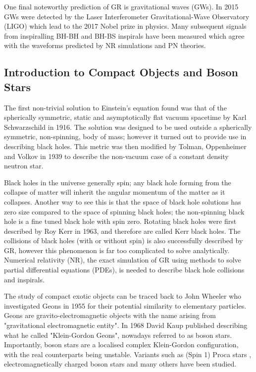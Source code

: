 One final noteworthy prediction of GR is gravitational waves (GWs). In 2015 GWs were detected by the Laser Interferometer Gravitational-Wave Observatory (LIGO) which lead to the 2017 Nobel prize in physics. Many subsequent signals from inspiralling BH-BH and BH-BS inspirals have been measured which agree with the waveforms predicted by NR simulations and PN theories. 

\subsection{Introduction to Compact Objects and Boson Stars}
The first non-trivial solution to Einstein's equation found was that of the spherically symmetric, static and asymptotically flat vacuum spacetime by Karl Schwarzschild in 1916. The solution was designed to be used outside a spherically symmetric, non-spinning, body of mass; however it turned out to provide use in describing black holes. This metric was then modified by Tolman, Oppenheimer and Volkov in 1939 to describe the non-vacuum case of a constant density neutron star. 

Black holes in the universe generally spin; any black hole forming from the collapse of matter will inherit the angular momentum of the matter as it collapses. Another way to see this is that the space of black hole solutions has zero size compared to the space of spinning black holes; the non-spinning black hole is a fine tuned black hole with spin zero. Rotating black holes were first described by Roy Kerr in 1963, and therefore are called Kerr black holes. The collisions of black holes (with or without spin) is also successfully described by GR, however this phenomenon is far too complicated to solve analytically. Numerical relativity (NR), the exact simulation of GR using methods to solve partial differential equations (PDEs), is needed to describe black hole collisions and inspirals. 

The study of compact exotic objects can be traced back to John Wheeler who investigated Geons in 1955 for their potential similarity to elementary particles. Geons are gravito-electromagnetic objects with the name arising from "gravitational electromagnetic entity". In 1968 David Kaup published \cite{Kaup:1968zz} describing what he called "Klein-Gordon Geons", nowadays referred to as boson stars. Importantly, boson stars are a localised complex Klein-Gordon configuration, with the real counterparts being unstable. Variants such as (Spin 1) Proca stars \cite{brito2016proca}, electromagnetically charged boson stars and many others have been studied. 

